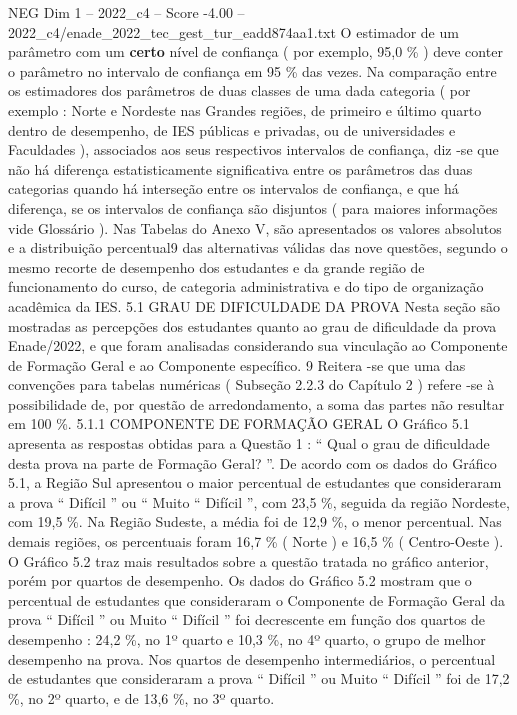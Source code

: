 \begin{textsample}{NEG Dim 1 – 2022\_c4 – Score -4.00 – 2022\_c4/enade\_2022\_tec\_gest\_tur\_eadd874aa1.txt}
O estimador de um parâmetro com um \textbf{certo} nível de confiança ( por exemplo, 95,0 \% ) deve conter o parâmetro no intervalo de confiança em 95 \% das vezes.
Na comparação entre os estimadores dos parâmetros de duas classes de uma dada categoria ( por exemplo : Norte e Nordeste nas Grandes regiões, de primeiro e último quarto dentro de desempenho, de IES públicas e privadas, ou de universidades e Faculdades ), associados aos seus respectivos intervalos de confiança, diz -se que não há diferença estatisticamente significativa entre os parâmetros das duas categorias quando há interseção entre os intervalos de confiança, e que há diferença, se os intervalos de confiança são disjuntos ( para maiores informações vide Glossário ).
Nas Tabelas do Anexo V, são apresentados os valores absolutos e a distribuição percentual9 das alternativas válidas das nove questões, segundo o mesmo recorte de desempenho dos estudantes e da grande região de funcionamento do curso, de categoria administrativa e do tipo de organização acadêmica da IES. 5.1 GRAU DE DIFICULDADE DA PROVA Nesta seção são mostradas as percepções dos estudantes quanto ao grau de dificuldade da prova Enade/2022, e que foram analisadas considerando sua vinculação ao Componente de Formação Geral e ao Componente específico. 9 Reitera -se que uma das convenções para tabelas numéricas ( Subseção 2.2.3 do Capítulo 2 ) refere -se à possibilidade de, por questão de arredondamento, a soma das partes não resultar em 100 \%. 5.1.1 COMPONENTE DE FORMAÇÃO GERAL O Gráfico 5.1 apresenta as respostas obtidas para a Questão 1 : “ Qual o grau de dificuldade desta prova na parte de Formação Geral? ”.
De acordo com os dados do Gráfico 5.1, a Região Sul apresentou o maior percentual de estudantes que consideraram a prova “ Difícil ” ou “ Muito “ Difícil ”, com 23,5 \%, seguida da região Nordeste, com 19,5 \%.
Na Região Sudeste, a média foi de 12,9 \%, o menor percentual.
Nas demais regiões, os percentuais foram 16,7 \% ( Norte ) e 16,5 \% ( Centro-Oeste ).
O Gráfico 5.2 traz mais resultados sobre a questão tratada no gráfico anterior, porém por quartos de desempenho.
Os dados do Gráfico 5.2 mostram que o percentual de estudantes que consideraram o Componente de Formação Geral da prova “ Difícil ” ou Muito “ Difícil ” foi decrescente em função dos quartos de desempenho : 24,2 \%, no 1º quarto e 10,3 \%, no 4º quarto, o grupo de melhor desempenho na prova.
Nos quartos de desempenho intermediários, o percentual de estudantes que consideraram a prova “ Difícil ” ou Muito “ Difícil ” foi de 17,2 \%, no 2º quarto, e de 13,6 \%, no 3º quarto.

\end{textsample}
